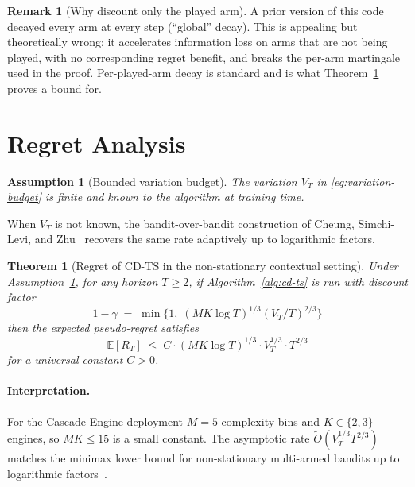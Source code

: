 \documentclass[11pt]{article}
\newtheorem{theorem}{Theorem}
\newtheorem{assumption}{Assumption}
\theoremstyle{definition}
\newtheorem{remark}{Remark}
\newcommand{\E}{\mathbb{E}}
\begin{document}
\begin{remark}[Why discount only the played arm]
\label{rem:per-arm-decay}
A prior version of this code decayed every arm at every step
(``global'' decay). This is appealing but theoretically wrong: it
accelerates information loss on arms that are not being played, with no
corresponding regret benefit, and breaks the per-arm martingale used in
the proof. Per-played-arm decay is standard
\cite{russac2019weighted,trovo2020sliding} and is what
Theorem~\ref{thm:main} proves a bound for.
\end{remark}

\section{Regret Analysis}
\label{sec:theory}

\begin{assumption}[Bounded variation budget]
\label{ass:budget}
The variation $V_T$ in \eqref{eq:variation-budget} is finite and known to
the algorithm at training time.
\end{assumption}

When $V_T$ is not known, the bandit-over-bandit construction of Cheung,
Simchi-Levi, and Zhu~\cite{cheung2019learning} recovers the same rate
adaptively up to logarithmic factors.

\begin{theorem}[Regret of CD-TS in the non-stationary contextual setting]
\label{thm:main}
Under Assumption~\ref{ass:budget}, for any horizon $T \geq 2$, if
Algorithm~\ref{alg:cd-ts} is run with discount factor
\[
1 - \gamma \;=\; \min\!\Big\{ 1,\; (M K \log T )^{1/3}(V_T / T)^{2/3}\Big\}
\]
then the expected pseudo-regret satisfies
\begin{equation}
\E[R_T] \;\leq\; C \cdot (M K \log T)^{1/3} \cdot V_T^{1/3} \cdot T^{2/3}
\label{eq:main-bound}
\end{equation}
for a universal constant $C > 0$.
\end{theorem}

\paragraph{Interpretation.}
For the Cascade Engine deployment $M = 5$ complexity bins and
$K \in \{2,3\}$ engines, so $MK \leq 15$ is a small constant. The
asymptotic rate $\widetilde{O}(V_T^{1/3}T^{2/3})$ matches the minimax lower
bound for non-stationary multi-armed bandits up to logarithmic
factors~\cite{garivier2008upper,besbes2014stochastic}.
\end{document}
